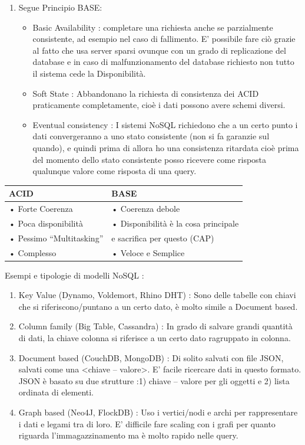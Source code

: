 \documentclass[a4page, 11pt]{article}
\begin{document}
\begin{enumerate}[noitemsep]
	\item
	Segue Principio BASE:
	\begin{itemize}
		
		\item
		Basic Availability : completare una richiesta anche se parzialmente consistente, ad esempio nel caso di fallimento. E' possibile fare ciò grazie al fatto che usa server sparsi ovunque con un grado di	replicazione del database e in caso di malfunzionamento del database richiesto non tutto il sistema cede la Disponibilità.
		\item
		Soft State : Abbandonano la richiesta di consistenza dei ACID praticamente completamente, cioè i dati possono avere schemi diversi.
		\item
		Eventual consistency : I sistemi NoSQL richiedono che a un certo punto i dati convergeranno a uno stato consistente (non si fa garanzie sul quando), e quindi prima di allora ho una consistenza ritardata cioè prima del momento dello stato consistente posso ricevere come risposta qualunque valore come risposta di una query.
	\end{itemize}
\end{enumerate}



\begin{center}
\begin{tabular}{|l|l|}
\hline
ACID & BASE \\
\hline
• Forte Coerenza & • Coerenza debole\\
• Poca disponibilità & • Disponibilità è la cosa principale\\
• Pessimo “Multitasking” & \quad e sacrifica per questo (CAP)\\
• Complesso & • Veloce e Semplice\\
\hline

\end{tabular}
\end{center}

Esempi e tipologie di modelli NoSQL :

\begin{enumerate}[noitemsep]
	 
	\item
	Key Value (Dynamo, Voldemort, Rhino DHT) : Sono delle tabelle con	chiavi che si riferiscono/puntano a un certo dato, è molto simile a Document based. 
	\item
	Column family (Big Table, Cassandra) : In grado di salvare grandi quantità di dati, la chiave colonna si riferisce a un certo dato ragruppato in colonna.
	\item
	Document based (CouchDB, MongoDB) : Di solito salvati con file JSON, salvati come una \textless{}chiave -- valore\textgreater{}. E' facile ricercare dati in questo formato. JSON è basato su due strutture :1) chiave -- valore per gli oggetti e 2) lista ordinata di elementi.
	\item
	Graph based (Neo4J, FlockDB) : Uso i vertici/nodi e archi per
	rappresentare i dati e legami tra di loro. E' difficile fare scaling	con i grafi per quanto riguarda l'immagazzinamento ma è molto rapido nelle query.
\end{enumerate}
\end{document}
